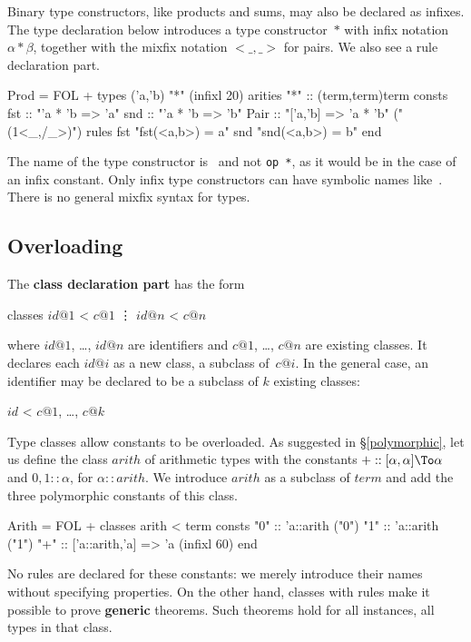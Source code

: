 Binary type constructors, like products and sums, may also be declared as
infixes.  The type declaration below introduces a type constructor~$*$ with
infix notation $\alpha*\beta$, together with the mixfix notation
${<}\_,\_{>}$ for pairs.  We also see a rule declaration part.
\begin{ttbox}
Prod = FOL +
types   ('a,'b) "*"                           (infixl 20)
arities "*"     :: (term,term)term
consts  fst     :: "'a * 'b => 'a"
        snd     :: "'a * 'b => 'b"
        Pair    :: "['a,'b] => 'a * 'b"       ("(1<_,/_>)")
rules   fst     "fst(<a,b>) = a"
        snd     "snd(<a,b>) = b"
end
\end{ttbox}

\begin{warn}
The name of the type constructor is~{\tt *} and not {\tt op~*}, as it would
be in the case of an infix constant.  Only infix type constructors can have
symbolic names like~{\tt *}.  There is no general mixfix syntax for types.
\end{warn}


\subsection{Overloading}
The {\bf class declaration part} has the form
\begin{ttbox}
classes \(id@1\) < \(c@1\)
        \vdots
        \(id@n\) < \(c@n\)
\end{ttbox}
where $id@1$, \ldots, $id@n$ are identifiers and $c@1$, \ldots, $c@n$ are
existing classes.  It declares each $id@i$ as a new class, a subclass
of~$c@i$.  In the general case, an identifier may be declared to be a
subclass of $k$ existing classes:
\begin{ttbox}
        \(id\) < \(c@1\), \ldots, \(c@k\)
\end{ttbox}
Type classes allow constants to be overloaded.  As suggested in
\S\ref{polymorphic}, let us define the class $arith$ of arithmetic
types with the constants ${+} :: [\alpha,\alpha]\To \alpha$ and $0,1 {::}
\alpha$, for $\alpha{::}arith$.  We introduce $arith$ as a subclass of
$term$ and add the three polymorphic constants of this class.
\begin{ttbox}
Arith = FOL +
classes arith < term
consts  "0"     :: 'a::arith                  ("0")
        "1"     :: 'a::arith                  ("1")
        "+"     :: ['a::arith,'a] => 'a       (infixl 60)
end
\end{ttbox}
No rules are declared for these constants: we merely introduce their
names without specifying properties.  On the other hand, classes
with rules make it possible to prove {\bf generic} theorems.  Such
theorems hold for all instances, all types in that class.

